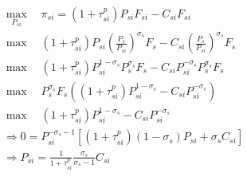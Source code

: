 \begin{gather*}
    \max_{P_{si}} \quad\pi_{si} =  (1+\tau_{si}^p)P_{si}F_{si} - C_{si} {F}_{si} \\
    \max  \quad (1+\tau_{si}^p)P_{si}( \frac{P_s}{ P_{si}})^{\sigma_s}{F}_s - C_{si} (\frac{P_s}{ P_{si}})^{\sigma_s}{F}_s \\
    \max \quad  (1+\tau_{si}^p)P_{si}^{1-\sigma_s}P_s^{\sigma_s}{F}_s - C_{si} P_{si}^{-\sigma_s}P_s^{\sigma_s}{F}_s \\
    \max \quad P_s^{\sigma_s}{F}_s \left(
        (1+\tau_{si}^p)P_{si}^{1-\sigma_s} - C_{si} P_{si}^{-\sigma_s} 
    \right)\\
    \max \quad  (1+\tau_{si}^p)P_{si}^{1-\sigma_s} - C_{si} P_{si}^{-\sigma_s} \\
    \Rightarrow 0 = P_{si}^{-\sigma_s - 1} \left[
        (1+\tau_{si}^p)(1-\sigma_s)P_{si} + \sigma_s C_{si} 
    \right]
    \\
    \Rightarrow P_{si} = \frac{1}{1+\tau_{si}^p}\frac{\sigma_s}{\sigma_s - 1} C_{si} 
\end{gather*}